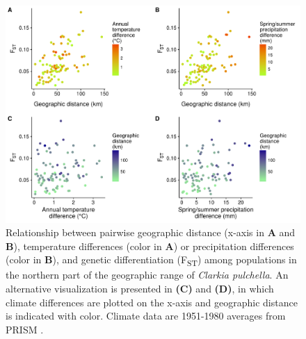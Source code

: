 \documentclass{article}
\begin{document}
\begin{figure}[p]
\centering
\includegraphics[width=16cm]{figs/fst_clim_dist_north.pdf}
\caption[Pairwise differences and genetic differentiation among northern populations]{Relationship between pairwise geographic distance (x-axis in \textbf{A} and \textbf{B}), temperature differences (color in \textbf{A}) or precipitation differences (color in \textbf{B}), and genetic differentiation (F\textsubscript{ST}) among populations in the northern part of the geographic range of \textit{Clarkia pulchella}. An alternative visualization is presented in \textbf{(C)} and \textbf{(D)}, in which climate differences are plotted on the x-axis and geographic distance is indicated with color.  Climate data are 1951-1980 averages from PRISM \citep{PRISM}.}
\label{fst_north}
\end{figure}
\end{document}

